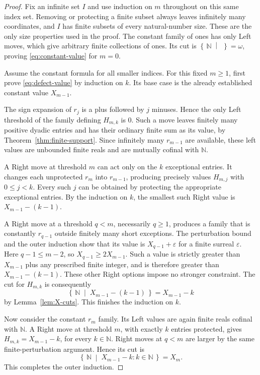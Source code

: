 \documentclass[11pt,letterpaper]{article}
\theoremstyle{definition}
\theoremstyle{remark}
\newcommand{\NN}{\mathbb N}
\newcommand{\cut}[2]{\left\{\,#1\;\middle|\;#2\,\right\}}
\begin{document}
\begin{proof}
Fix an infinite set $I$ and use induction on $m$ throughout on this same index
set. Removing or protecting a finite subset always leaves infinitely many
coordinates, and $I$ has finite subsets of every natural-number size. These
are the only size properties used in the proof. The constant family of ones
has only Left moves, which give arbitrary finite collections of ones. Its cut is
$\cut{\NN}{}=\omega$, proving \eqref{eq:constant-value} for $m=0$.

Assume the constant formula for all smaller indices. For this fixed $m\geq1$,
first prove \eqref{eq:defect-value} by induction on $k$. Its base case is the
already established constant value $X_{m-1}$.

The sign expansion of $r_j$ is a plus followed by $j$ minuses. Hence the only
Left threshold of the family defining $H_{m,k}$ is $0$. Such a move leaves
finitely many positive dyadic entries and has their ordinary finite sum as its
value, by Theorem~\ref{thm:finite-support}. Since infinitely many $r_{m-1}$ are
available, these left values are unbounded finite reals and are mutually
cofinal with $\NN$.

A Right move at threshold $m$ can act only on the $k$ exceptional entries.
It changes each unprotected $r_m$ into $r_{m-1}$, producing precisely values
$H_{m,j}$ with $0\leq j<k$. Every such $j$ can be obtained by protecting the
appropriate exceptional entries. By the induction on $k$, the smallest such
Right value is $X_{m-1}-(k-1)$.

A Right move at a threshold $q<m$, necessarily $q\geq1$, produces a family
that is constantly $r_{q-1}$ outside finitely many short exceptions. The
perturbation bound and the outer induction show that its value is
$X_{q-1}+\varepsilon$ for a finite surreal $\varepsilon$. Here
$q-1\leq m-2$, so $X_{q-1}\geq2X_{m-1}$. Such a value is strictly greater than
$X_{m-1}$ plus any prescribed finite integer, and is therefore greater than
$X_{m-1}-(k-1)$. These other Right options impose no stronger constraint.
The cut for $H_{m,k}$ is consequently
\[
                     \cut{\NN}{X_{m-1}-(k-1)}=X_{m-1}-k
\]
by Lemma~\ref{lem:X-cuts}. This finishes the induction on $k$.

Now consider the constant $r_m$ family. Its Left values are again finite reals
cofinal with $\NN$. A Right move at threshold $m$, with exactly $k$ entries
protected, gives $H_{m,k}=X_{m-1}-k$, for every $k\in\NN$. Right moves at
$q<m$ are larger by the same finite-perturbation argument. Hence its cut is
\[
                      \cut{\NN}{X_{m-1}-k:k\in\NN}=X_m.
\]
This completes the outer induction.
\end{proof}
\end{document}
